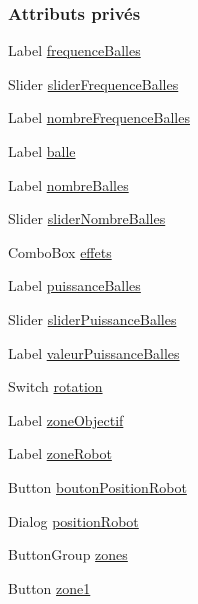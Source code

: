 \subsubsection*{Attributs privés}
\begin{DoxyCompactItemize}
\item 
Label \hyperlink{class_fenetre_reglages_af5bcb490af289e05ef900f48196d8c1a}{frequence\+Balles}
\item 
Slider \hyperlink{class_fenetre_reglages_a30655dce5ab572ceca29b99aff34043b}{slider\+Frequence\+Balles}
\item 
Label \hyperlink{class_fenetre_reglages_aa650fe04347ba60b6cf8d9315127101a}{nombre\+Frequence\+Balles}
\item 
Label \hyperlink{class_fenetre_reglages_aedfba3f829a90409b052cf404407a42d}{balle}
\item 
Label \hyperlink{class_fenetre_reglages_ac05c884f418b15f10f2059bfdf66f88a}{nombre\+Balles}
\item 
Slider \hyperlink{class_fenetre_reglages_a9b780b30102e6067eac57b19dbd99830}{slider\+Nombre\+Balles}
\item 
Combo\+Box \hyperlink{class_fenetre_reglages_afb83e256cb2a34bea8eab267ab652b73}{effets}
\item 
Label \hyperlink{class_fenetre_reglages_a16a256d352978b8c61ecebbfcedcc282}{puissance\+Balles}
\item 
Slider \hyperlink{class_fenetre_reglages_a3f7d3df9bcdb9d2760150a3d4220b501}{slider\+Puissance\+Balles}
\item 
Label \hyperlink{class_fenetre_reglages_a730b8bb1584b90b5a7908704b9328eee}{valeur\+Puissance\+Balles}
\item 
Switch \hyperlink{class_fenetre_reglages_ac39acfcc2a454c75d553abd40d6859da}{rotation}
\item 
Label \hyperlink{class_fenetre_reglages_abc617edb1d8edab125aa03b83d0369d2}{zone\+Objectif}
\item 
Label \hyperlink{class_fenetre_reglages_a46e9f97bfa051c1b80e115ab983036a2}{zone\+Robot}
\item 
Button \hyperlink{class_fenetre_reglages_acf9b060a552f6502635527be049e6138}{bouton\+Position\+Robot}
\item 
Dialog \hyperlink{class_fenetre_reglages_a158f8750273eb661e8f5bb6d14503b62}{position\+Robot}
\item 
Button\+Group \hyperlink{class_fenetre_reglages_a0c47bcabbb7f9a375cd1c10da62012e2}{zones}
\item 
Button \hyperlink{class_fenetre_reglages_afb2e983cbb669cb65ab0d6bba6bf1aad}{zone1}

\end{DoxyCompactItemize}
